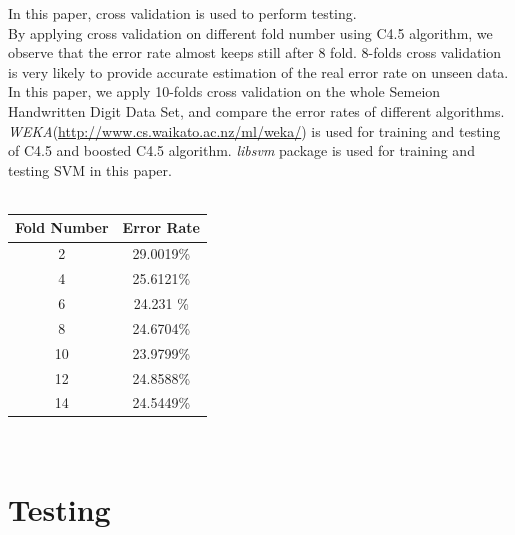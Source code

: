\documentclass[a4paper,11pt]{article}
\begin{document}
In this paper, cross validation is used to perform testing. \\
By applying cross validation on different fold number using C4.5 algorithm, we observe that the error rate almost keeps still after 8 fold. 8-folds cross validation is very likely to provide accurate estimation of the real error rate on unseen data. In this paper, we apply 10-folds cross validation on the whole Semeion Handwritten Digit Data Set, and compare the error rates of different algorithms.\\
\emph{WEKA}(\url{http://www.cs.waikato.ac.nz/ml/weka/}) is used for training and testing of C4.5 and boosted C4.5 algorithm. \emph{libsvm} package\cite{libsvm} is used for training and testing SVM in this paper.\\
\vspace{0.5cm}\\
\begin{tabular}{c c}
Fold Number & Error Rate\\
\hline \hline
2  &29.0019\%\\
4  &25.6121\%\\
6  &24.231 \%\\
8  & 24.6704\%\\
10 & 23.9799\%\\
12 & 24.8588\%\\
14 & 24.5449\%\\
\end{tabular}
\vspace{0.5cm}\\
\section{Testing}
\end{document}
